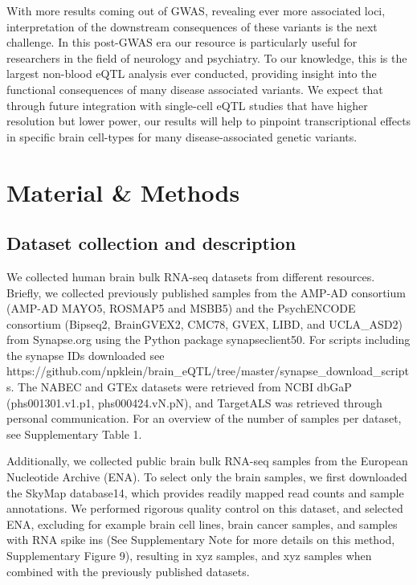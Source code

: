 With more results coming out of GWAS, revealing ever more associated loci, interpretation of the downstream consequences of these variants is the next challenge. In this post-GWAS era our resource is particularly useful for researchers in the field of neurology and psychiatry. To our knowledge, this is the largest non-blood eQTL analysis ever conducted, providing insight into the functional consequences of many disease associated variants. We expect that through future integration with single-cell eQTL studies that have higher resolution but lower power, our results will help to pinpoint transcriptional effects in specific brain cell-types for many disease-associated genetic variants.

\section{Material \& Methods}
\subsection{Dataset collection and description }
We collected human brain bulk RNA-seq datasets from different resources. Briefly, we collected previously published samples from the AMP-AD consortium (AMP-AD MAYO5, ROSMAP5 and MSBB5) and the PsychENCODE consortium (Bipseq2, BrainGVEX2, CMC78, GVEX, LIBD, and UCLA_ASD2) from Synapse.org using the Python package synapseclient50. For scripts including the synapse IDs downloaded see https://github.com/npklein/brain_eQTL/tree/master/synapse_download_scripts. The NABEC and GTEx datasets were retrieved from NCBI dbGaP (phs001301.v1.p1, phs000424.vN.pN), and TargetALS was retrieved through personal communication. For an overview of the number of samples per dataset, see Supplementary Table 1. 

Additionally, we collected public brain bulk RNA-seq samples from the European Nucleotide Archive (ENA). To select only the brain samples, we first downloaded the SkyMap database14, which provides readily mapped read counts and sample annotations. We performed rigorous quality control on this dataset, and selected ENA, excluding for example brain cell lines, brain cancer samples, and samples with RNA spike ins (See Supplementary Note for more details on this method, Supplementary Figure 9), resulting in xyz samples, and xyz samples when combined with the previously published datasets. 

